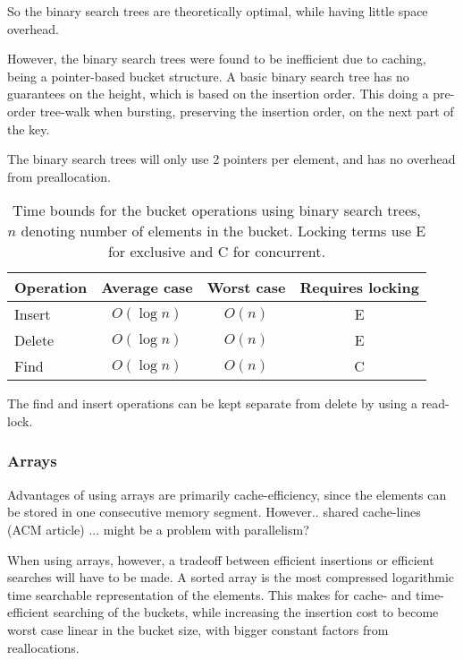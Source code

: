 So the binary search trees are theoretically optimal, while having little space
overhead.

However, the binary search trees were found to be inefficient due to caching,
being a pointer-based bucket structure. A basic binary search tree has no
guarantees on the height, which is based on the insertion order. This doing a
pre-order tree-walk when bursting, preserving the insertion order, on the next
part of the key.

The binary search trees will only use 2 pointers per element, and
has no overhead from preallocation. 

\begin{table}[h!]
    \centering
    \begin{tabular}[here]{ l || c | c | c}
        Operation & Average case & Worst case & Requires locking  \\ \hline
        Insert    & $O(\log n)$ & $O(n)$ & E \\ \hline
        Delete    & $O(\log n)$ & $O(n)$ & E \\ \hline
        Find      & $O(\log n)$ & $O(n)$ & C  \\ \hline
    \end{tabular}
    \caption{Time bounds for the bucket operations using binary search trees,
    $n$ denoting number of elements in the bucket. Locking terms use E for
        exclusive and C for concurrent.}
    \label{tab:bounds:linkedlist}
\end{table}
The find and insert operations can be kept separate from delete by using a
read-lock.

\subsubsection{Arrays}
Advantages of using arrays are primarily cache-efficiency, since the
elements can be stored in one consecutive memory segment.
However.. shared cache-lines (ACM article) ... might be a problem with parallelism?

When using arrays, however, a tradeoff between efficient insertions or
efficient searches will have to be made. A sorted array is the most compressed
logarithmic time searchable representation of the elements. This makes for
cache- and time-efficient searching of the buckets, while increasing the
insertion cost to become worst case linear in the bucket size, with bigger
constant factors from reallocations.

